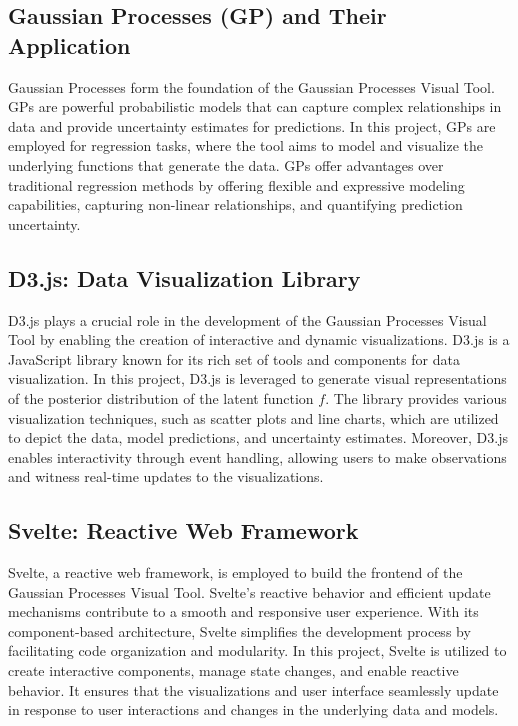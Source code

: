\documentclass[preprint,journal]{vgtc}       %
\begin{document}
\subsection{Gaussian Processes (GP) and Their Application}

Gaussian Processes form the foundation of the Gaussian Processes Visual Tool. GPs are powerful probabilistic models that can capture complex relationships in data and provide uncertainty estimates for predictions. In this project, GPs are employed for regression tasks, where the tool aims to model and visualize the underlying functions that generate the data. GPs offer advantages over traditional regression methods by offering flexible and expressive modeling capabilities, capturing non-linear relationships, and quantifying prediction uncertainty.

\subsection{D3.js: Data Visualization Library}

D3.js plays a crucial role in the development of the Gaussian Processes Visual Tool by enabling the creation of interactive and dynamic visualizations. D3.js is a JavaScript library known for its rich set of tools and components for data visualization. In this project, D3.js is leveraged to generate visual representations of the posterior distribution of the latent function $f$. The library provides various visualization techniques, such as scatter plots and line charts, which are utilized to depict the data, model predictions, and uncertainty estimates. Moreover, D3.js enables interactivity through event handling, allowing users to make observations and witness real-time updates to the visualizations.

\subsection{Svelte: Reactive Web Framework}

Svelte, a reactive web framework, is employed to build the frontend of the Gaussian Processes Visual Tool. Svelte's reactive behavior and efficient update mechanisms contribute to a smooth and responsive user experience. With its component-based architecture, Svelte simplifies the development process by facilitating code organization and modularity. In this project, Svelte is utilized to create interactive components, manage state changes, and enable reactive behavior. It ensures that the visualizations and user interface seamlessly update in response to user interactions and changes in the underlying data and models.
\end{document}
